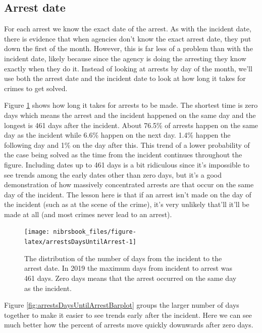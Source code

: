 \documentclass[
  12pt,
  openany]{book}
\begin{document}
\hypertarget{arrest-date}{%
\subsection{Arrest date}\label{arrest-date}}

For each arrest we know the exact date of the arrest. As with the incident date, there is evidence that when agencies don't know the exact arrest date, they put down the first of the month. However, this is far less of a problem than with the incident date, likely because since the agency is doing the arresting they know exactly when they do it. Instead of looking at arrests by day of the month, we'll use both the arrest date and the incident date to look at how long it takes for crimes to get solved.

Figure \ref{fig:arrestsDaysUntilArrest} shows how long it takes for arrests to be made. The shortest time is zero days which means the arrest and the incident happened on the same day and the longest is 461 days after the incident. About 76.5\% of arrests happen on the same day as the incident while 6.6\% happen on the next day. 1.4\% happen the following day and 1\% on the day after this. This trend of a lower probability of the case being solved as the time from the incident continues throughout the figure. Including dates up to 461 days is a bit ridiculous since it's impossible to see trends among the early dates other than zero days, but it's a good demonstration of how massively concentrated arrests are that occur on the same day of the incident. The lesson here is that if an arrest isn't made on the day of the incident (such as at the scene of the crime), it's very unlikely that'll it'll be made at all (and most crimes never lead to an arrest).

\begin{figure}

{\centering \texttt{[image: nibrsbook\_files/figure-latex/arrestsDaysUntilArrest-1]} 

}

\caption{The distribution of the number of days from the incident to the arrest date. In 2019 the maximum days from incident to arrest was 461 days. Zero days means that the arrest occurred on the same day as the incident.}\label{fig:arrestsDaysUntilArrest}
\end{figure}

Figure \ref{fig:arrestsDaysUntilArrestBarplot} groups the larger number of days together to make it easier to see trends early after the incident. Here we can see much better how the percent of arrests move quickly downwards after zero days.
\end{document}
